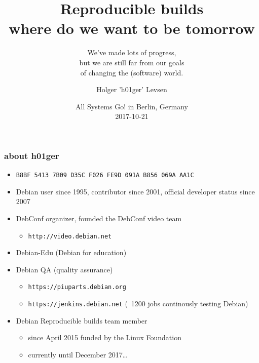 \documentclass[14pt,aspectratio=169]{beamer}
\title[Reproducible Builds tomorrow]{Reproducible
builds \\ where do we want to be tomorrow}
\subtitle{We've made lots of progress, \\
but we are still far from our goals \\
of changing the (software) world.}
\author[h01ger]{%
   \texorpdfstring{
            \centering
            Holger 'h01ger' Levsen
   }{h01ger}}
\date[All Systems Go!]{%
 All Systems Go! in Berlin, Germany\\
 \small{2017-10-21}}
\newif\ifplacelogo
\begin{document}
\placelogofalse

\begin{frame}[plain]
 \titlepage
\end{frame}

\placelogotrue

\begin{frame}
 \frametitle{about h01ger}

 \begin{itemize}
  \item \small{\texttt{B8BF 5413 7B09 D35C F026  FE9D 091A B856 069A AA1C}}
  \item Debian user since 1995, contributor since 2001, official developer
  status since 2007
  \item DebConf organizer,
  founded the DebConf video team
   \begin{itemize}
    \item \texttt{http://video.debian.net}
   \end{itemize}
 \item Debian-Edu (Debian for education)
  \item Debian QA (quality assurance)
  \begin{itemize}
   \item \texttt{https://piuparts.debian.org}
   \item \texttt{https://jenkins.debian.net} (~1200 jobs continously testing Debian)
  \end{itemize}
  \item Debian Reproducible builds team member
  \begin{itemize}
   \item since April 2015 funded by the Linux Foundation
   \item currently until December 2017…
 \end{itemize}
 \end{itemize}
\end{frame}
\end{document}
